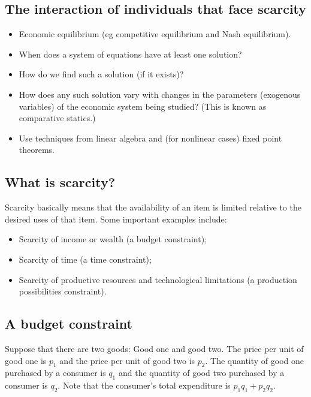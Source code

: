 \documentclass[letterpaper,10pt,english]{jupyterBook}
\begin{document}
\subsection{The interaction of individuals that face scarcity}
\label{\detokenize{01.intro_to_economics:the-interaction-of-individuals-that-face-scarcity}}\begin{itemize}
\item {} 
\sphinxAtStartPar
Economic equilibrium (eg competitive equilibrium and Nash equilibrium).

\item {} 
\sphinxAtStartPar
When does a system of equations have at least one solution?

\item {} 
\sphinxAtStartPar
How do we find such a solution (if it exists)?

\item {} 
\sphinxAtStartPar
How does any such solution vary with changes in the parameters (exogenous variables) of the economic system being studied? (This is known as comparative statics.)

\item {} 
\sphinxAtStartPar
Use techniques from linear algebra and (for nonlinear cases) fixed point theorems.

\end{itemize}


\subsection{What is scarcity?}
\label{\detokenize{01.intro_to_economics:what-is-scarcity}}
\sphinxAtStartPar
Scarcity basically means that the availability of an item is limited
relative to the desired uses of that item.  Some important examples include:
\begin{itemize}
\item {} 
\sphinxAtStartPar
Scarcity of income or wealth (a budget constraint);

\item {} 
\sphinxAtStartPar
Scarcity of time (a time constraint);

\item {} 
\sphinxAtStartPar
Scarcity of productive resources and technological limitations (a production possibilities constraint).

\end{itemize}


\subsection{A budget constraint}
\label{\detokenize{01.intro_to_economics:a-budget-constraint}}
\sphinxAtStartPar
Suppose that there are two goods: Good one and good two. The price per unit of good one is \(p_1\) and the price per unit of good two is \(p_2\). The quantity of good one purchased by a consumer is \(q_1\) and the quantity of good two purchased by a consumer is \(q_2\). Note that the consumer’s total expenditure is \(p_1 q_1 + p_2 q_2\).
\end{document}
